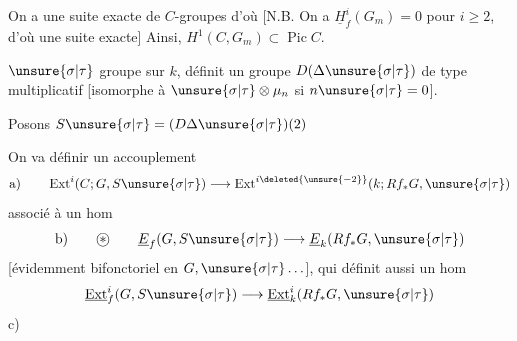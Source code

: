 On a une suite exacte de $C$-groupes
d'où
[N.B. On a $\underline H^i_f(G_m)=0$ pour $i\geq2$,  d'où une suite exacte\unsure{\ldots}]
Ainsi, $H^1(C,G_m)\subset\operatorname{Pic} C$.

$\unsure{\sigma|\tau}$ groupe    sur $k$,
définit un groupe  $D(\Delta\unsure{\sigma|\tau})$ de type multiplicatif [isomorphe à $\unsure{\sigma|\tau}\otimes\mu_n$ si $n\unsure{\sigma|\tau}=0$].

Posons $S\unsure{\sigma|\tau}=(D\Delta\unsure{\sigma|\tau})(2)$

On va définir un  accouplement
\[
\text{a)}\qquad \operatorname{Ext}^i(C;G,S\unsure{\sigma|\tau})\longrightarrow
\operatorname{Ext}^{i\deleted{\unsure{-2}}}(k;Rf_*G,\unsure{\sigma|\tau})
\]
associé à un hom
\[
\text{b)}\qquad \text{\textcircled{$*$}}\qquad
\underline E_f(G,S\unsure{\sigma|\tau})\longrightarrow\underline E_k(Rf_*G,\unsure{\sigma|\tau})
\]
[évidemment bifonctoriel en $G,\unsure{\sigma|\tau}\ldots$], qui définit aussi un hom
\[
\underline{\operatorname{Ext}}^i_f(G,S\unsure{\sigma|\tau})\longrightarrow
\underline{\operatorname{Ext}}^i_k(Rf_*G,\unsure{\sigma|\tau})
\]
c)

